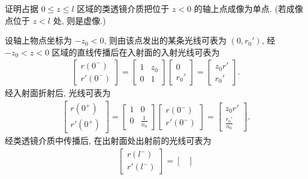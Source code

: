 \documentclass[twoside]{note}
\begin{document}
\begin{exe}
    证明占据 $0\leq z\leq l$ 区域的类透镜介质把位于 $z<0$ 的轴上点成像为单点. (若成像点位于 $z<l$ 处, 则是虚像.)
\end{exe}
\begin{pf}
    设轴上物点坐标为 $-z_0<0$, 则由该点发出的某条光线可表为 $(0,r_0')$, 经 $-z_0<z<0$ 区域的直线传播后在入射面的入射光线可表为
    \begin{align}
        \begin{bmatrix}
            r(0^-)\\
            r'(0^-)
        \end{bmatrix}=\begin{bmatrix}
            1&z_0\\
            0&1
        \end{bmatrix}\begin{bmatrix}
            0\\
            r_0'
        \end{bmatrix}=\begin{bmatrix}
            z_0r'\\
            r_0'
        \end{bmatrix}.
    \end{align}
    经入射面折射后, 光线可表为
    \begin{align}
        \begin{bmatrix}
            r(0^+)\\
            r'(0^+)
        \end{bmatrix}=\begin{bmatrix}
            1&0\\
            0&\frac{1}{n_0}
        \end{bmatrix}\begin{bmatrix}
            r(0^-)\\
            r'(0^-)
        \end{bmatrix}=\begin{bmatrix}
            z_0r'\\
            \frac{r_0'}{n_0}
        \end{bmatrix}.
    \end{align}
    经类透镜介质中传播后, 在出射面处出射前的光线可表为
    \begin{align}
        \begin{bmatrix}
            r(l^-)\\
            r'(l^-)
        \end{bmatrix}=\begin{bmatrix}

\end{bmatrix}
\end{align}
\end{pf}
\end{document}
